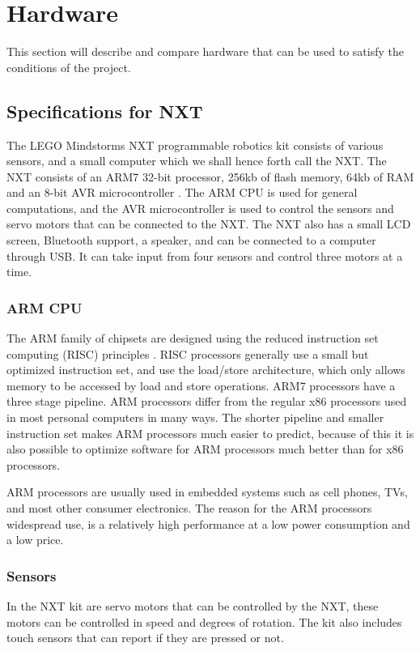 \section{Hardware}
This section will describe and compare hardware that can be used to satisfy the conditions of the project.

\subsection{Specifications for NXT}
The LEGO Mindstorms NXT programmable robotics kit consists of various sensors, and a small computer which we shall hence forth call the NXT. The NXT consists of an ARM7 32-bit processor, 256kb of flash memory, 64kb of RAM and an 8-bit AVR microcontroller \cite{nxtspec}. The ARM CPU is used for general computations, and the AVR microcontroller is used to control the sensors and servo motors that can be connected to the NXT. The NXT also has a small LCD screen, Bluetooth support, a speaker, and can be connected to a computer through USB. It can take input from four sensors and control three motors at a time.

\subsubsection{ARM CPU}
The ARM family of chipsets are designed using the reduced instruction set computing (RISC) principles \cite{armarchitecture}. RISC processors generally use a small but optimized instruction set, and use the load/store architecture, which only allows memory to be accessed by load and store operations. ARM7 processors have a three stage pipeline. ARM processors differ from the regular x86 processors used in most personal computers in many ways. The shorter pipeline and smaller instruction set makes ARM processors much easier to predict, because of this it is also possible to optimize software for ARM processors much better than for x86 processors.

ARM processors are usually used in embedded systems such as cell phones, TVs, and most other consumer electronics. The reason for the ARM processors widespread use, is a relatively high performance at a low power consumption and a low price.

\subsubsection{Sensors}
In the NXT kit are servo motors that can be controlled by the NXT, these motors can be controlled in speed and degrees of rotation. The kit also includes touch sensors that can report if they are pressed or not.

